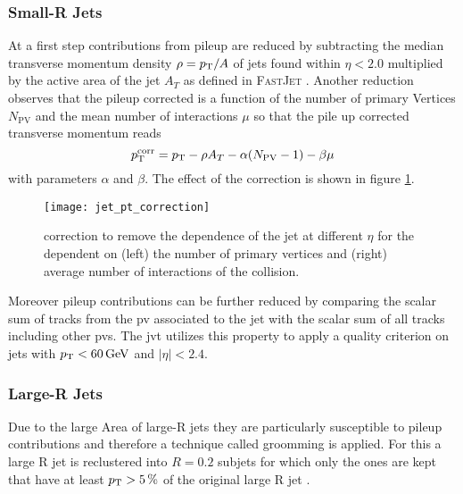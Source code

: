 \subsubsection*{Small-R Jets}
At a first step contributions from pileup are reduced by subtracting the median transverse momentum density $\rho=p_{\text{T}} / A$ of jets found within $\eta<2.0$ multiplied by the active area of the jet $A_T$ as defined in \textsc{FastJet} \citep{cacciari2012fastjet}. Another reduction observes that the pileup corrected \pt is a function of the number of primary Vertices $N_\text{PV}$ and the mean number of interactions $\mu$ so that the pile up corrected transverse momentum reads
\begin{equation}
  p_{\text{T}}^\text{corr}=p_{\text{T}}-\rho A_T -\alpha(N_\text{PV}-1)-\beta\mu
\end{equation}
with parameters $\alpha$ and $\beta$. The effect of the correction is shown in figure \ref{fig:jet_pt_correction}.
\begin{figure}
  \centering
  \texttt{[image: jet\_pt\_correction]}
  \caption[]{\pt correction to remove the \pt dependence of the jet at different $\eta$ for the \pt dependent on (left) the number of primary vertices and (right) average number of interactions of the collision.}
  \label{fig:jet_pt_correction}
\end{figure}

Moreover pileup contributions can be further reduced by comparing the scalar \pt sum of tracks from the \ac{pv} associated to the jet with the scalar \pt sum of all tracks including other \acp{pv}. The \ac{jvt} \citep{ATLAS-CONF-2014-018} utilizes this property to apply a quality criterion on jets with $p_{\text{T}}<\qty[]{60}{GeV}$ and $|\eta|<2.4$.


\subsubsection*{Large-R Jets}
Due to the large Area of large-R jets they are particularly susceptible to pileup contributions and therefore a technique called groomming is applied. For this a large R jet is reclustered into $R=0.2$ subjets for which only the ones are kept that have at least $p_{\text{T}}>\qty[]{5}{\percent}$ of the original large R jet \pt.

